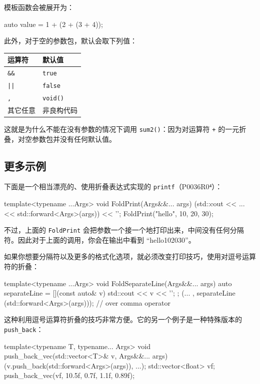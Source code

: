 模板函数会被展开为：

\begin{codebox}[cpp]
auto value = 1 + (2 + (3 + 4));
\end{codebox}

此外，对于空的参数包，默认会取下列值：

\begin{table}[H]
\centering
\begin{tabularx}{\textwidth}{X X}
\toprule
运算符 & 默认值 \\
\midrule
\texttt{\&\&} & \texttt{true} \\
\texttt{||} & \texttt{false} \\
\texttt{,} & \texttt{void()} \\
其它任意 & 非良构代码 \\
\bottomrule
\end{tabularx}
\end{table}

这就是为什么不能在没有参数的情况下调用 \texttt{sum2()}：因为对运算符 \texttt{+} 的一元折叠，对空参数包并没有任何默认值。

\subsection{更多示例}

下面是一个相当漂亮的、使用折叠表达式实现的 \texttt{printf}（P0036R0⁴）：

\begin{codebox}[cpp]
template<typename ...Args>
void FoldPrint(Args&&... args)
{
(std::cout << ... << std::forward<Args>(args)) << '\n';
}
FoldPrint("hello", 10, 20, 30);
\end{codebox}

不过，上面的 \texttt{FoldPrint} 会把参数一个接一个地打印出来，中间没有任何分隔符。因此对于上面的调用，你会在输出中看到 “hello102030”。

如果你想要分隔符以及更多的格式化选项，就必须改变打印技巧，使用对逗号运算符的折叠：

\begin{codebox}[cpp]
template<typename ...Args>
void FoldSeparateLine(Args&&... args)
{
auto separateLine = [](const auto& v) {
std::cout << v << '\n';
};
(... , separateLine (std::forward<Args>(args))); // over comma operator
}
\end{codebox}

这种利用逗号运算符折叠的技巧非常方便。它的另一个例子是一种特殊版本的 \texttt{push\_back}：

\begin{codebox}[cpp]
template<typename T, typename... Args>
void push_back_vec(std::vector<T>& v, Args&&... args)
{
(v.push_back(std::forward<Args>(args)), ...);
}
std::vector<float> vf;
push_back_vec(vf, 10.5f, 0.7f, 1.1f, 0.89f);
\end{codebox}

